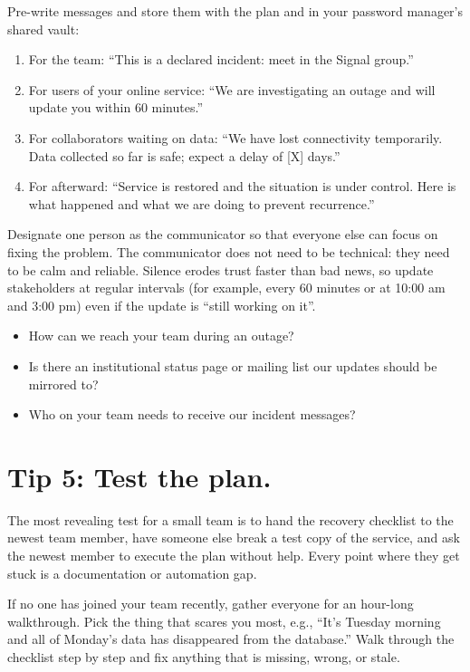 \documentclass[10pt,letterpaper]{article}
\begin{document}
Pre-write messages and store them with the plan and in your password manager's
shared vault:

\begin{enumerate}
\item
  For the team: ``This is a declared incident: meet in the Signal group.''
\item
  For users of your online service: ``We are investigating an outage and
  will update you within 60 minutes.''
\item
  For collaborators waiting on data: ``We have lost connectivity temporarily.
  Data collected so far is safe; expect a delay of [X] days.''
\item
  For afterward: ``Service is restored and the situation is under control.
  Here is what happened and what we are doing to prevent recurrence.''
\end{enumerate}

Designate one person as the communicator so that everyone else can focus on
fixing the problem. The communicator does not need to be technical: they need to
be calm and reliable. Silence erodes trust faster than bad news, so update
stakeholders at regular intervals (for example, every 60 minutes or at 10:00 am
and 3:00 pm) even if the update is ``still working on it''.

\begin{notebox}
  \begin{itemize}
  \item How can we reach your team during an outage?
  \item Is there an institutional status page or mailing list our updates should
    be mirrored to?
  \item Who on your team needs to receive our incident messages?
  \end{itemize}
\end{notebox}

\section*{Tip 5: Test the plan.}

The most revealing test for a small team is to hand the recovery checklist to
the newest team member, have someone else break a test copy of the service, and
ask the newest member to execute the plan without help. Every point where they
get stuck is a documentation or automation gap.

If no one has joined your team recently, gather everyone for an hour-long
walkthrough. Pick the thing that scares you most, e.g., ``It's Tuesday morning
and all of Monday's data has disappeared from the database.'' Walk through the
checklist step by step and fix anything that is missing, wrong, or stale.
\end{document}
